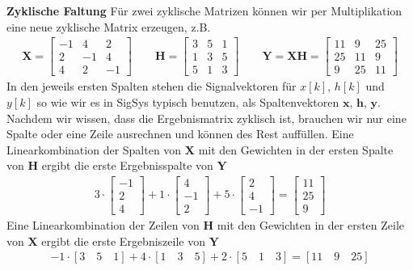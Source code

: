 \textbf{Zyklische Faltung}
Für zwei zyklische Matrizen können wir per Multiplikation eine
neue zyklische Matrix erzeugen, z.B.
\begin{align}
\bm{X} =
\begin{bmatrix}
-1 &  4 &  2\\
 2 & -1 &  4\\
 4 &  2 & -1
\end{bmatrix}
\qquad
\bm{H} =
\begin{bmatrix}
3 & 5 & 1\\
1 & 3 & 5\\
5 & 1 & 3
\end{bmatrix}
\qquad
\bm{Y} = \bm{X}\bm{H} =
\begin{bmatrix}
11  &   9  &  25\\
25  &  11  &  9\\
 9  &  25  &  11
\end{bmatrix}
\end{align}
In den jeweils ersten Spalten stehen die Signalvektoren für $x[k]$, $h[k]$ und $y[k]$
so wie wir es in SigSys typisch benutzen, als Spaltenvektoren $\bm{x}$, $\bm{h}$, $\bm{y}$.
%
Nachdem wir wissen, dass die Ergebnismatrix zyklisch ist, brauchen wir nur
eine Spalte oder eine Zeile ausrechnen und können des Rest auffüllen.
%
Eine Linearkombination der Spalten von $\bm{X}$ mit den Gewichten in der
ersten Spalte von $\bm{H}$ ergibt die erste Ergebnisspalte von $\bm{Y}$
\begin{align}
3\cdot
\begin{bmatrix}
-1\\
 2\\
 4
\end{bmatrix}
+
1\cdot
\begin{bmatrix}
4\\
-1\\
2
\end{bmatrix}
+5\cdot
\begin{bmatrix}
2\\
4\\
-1
\end{bmatrix}
=
\begin{bmatrix}
11\\
25\\
 9
\end{bmatrix}
\end{align}
Eine Linearkombination der Zeilen von $\bm{H}$ mit den Gewichten in der ersten Zeile
von $\bm{X}$ ergibt die erste Ergebniszeile von $\bm{Y}$
\begin{align}
\label{eq:C8864C8D9F_LinComb_Row}
-1 \cdot [3 \quad 5 \quad 1] + 4 \cdot [1 \quad 3 \quad 5] + 2 \cdot [5 \quad 1 \quad 3] =
[11 \quad 9 \quad 25]
\end{align}
